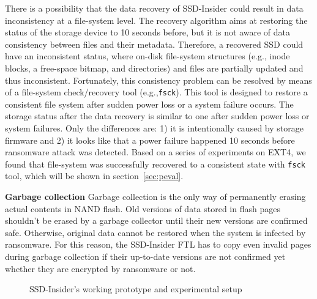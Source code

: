 \documentclass[conference]{IEEEtran}
\newcommand{\eg}{e.g.,\xspace}
\newcommand{\ours}{SSD-Insider}
\begin{document}
There is a possibility that the data recovery of \ours{} could
result in data inconsistency at a file-system level.  The recovery
algorithm aims at restoring the status of the storage device to 10
seconds before, but it is not aware of data consistency between files
and their metadata.  Therefore, a recovered SSD could have an
inconsistent status, where on-disk file-system structures (\eg
inode blocks, a free-space bitmap, and directories) and files are
partially updated and thus inconsistent.  Fortunately, this
consistency problem can be resolved by means of a file-system
check/recovery tool (\eg \texttt{fsck}).  This tool is designed
to restore a consistent file system after sudden power loss or a
system failure occurs.  The storage status after the data recovery
is similar to one after sudden power loss or system failures. Only
the differences are: 1) it is intentionally caused by storage
firmware and 2) it looks like that a power failure happened 10
seconds before ransomware attack was detected.  Based on a series
of experiments on EXT4, we found that file-system was successfully
recovered to a consistent state with \texttt{fsck} tool, 
which will be shown in section~\ref{sec:peval}.

{\bf Garbage collection} 
Garbage collection is the only way of permanently erasing actual
contents in NAND flash. Old versions of data stored in
flash pages shouldn't be erased by a garbage collector until their
new versions are confirmed safe. Otherwise, original data cannot be
restored when the system is infected by ransomware.  For this
reason, the \ours{} FTL has to copy even invalid pages during
garbage collection if their up-to-date versions are not confirmed
yet whether they are encrypted by ransomware or not. 

\begin{figure}[t]
\centering
{}\hfill
{}\hfill
{}
\caption{\ours{}'s working prototype and experimental setup}
\label{fig:platform}
\end{figure}
\end{document}
